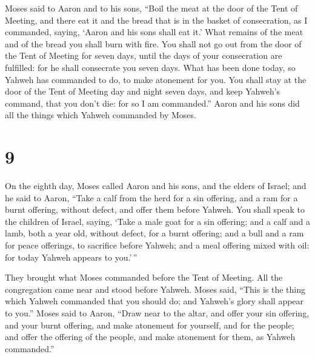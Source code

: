  Moses said to Aaron and to his sons, ``Boil the meat at
the door of the Tent of Meeting, and there eat it and the bread that is
in the basket of consecration, as I commanded, saying, `Aaron and his
sons shall eat it.'  What remains of the meat and of the
bread you shall burn with fire.  You shall not go out from
the door of the Tent of Meeting for seven days, until the days of your
consecration are fulfilled: for he shall consecrate you seven days.
 What has been done today, so Yahweh has commanded to do,
to make atonement for you.  You shall stay at the door of
the Tent of Meeting day and night seven days, and keep Yahweh's command,
that you don't die: for so I am commanded.''  Aaron and his
sons did all the things which Yahweh commanded by Moses.

\hypertarget{section-8}{%
\section{9}\label{section-8}}

 On the eighth day, Moses called Aaron and his sons, and the
elders of Israel;  and he said to Aaron, ``Take a calf from
the herd for a sin offering, and a ram for a burnt offering, without
defect, and offer them before Yahweh.  You shall speak to
the children of Israel, saying, `Take a male goat for a sin offering;
and a calf and a lamb, both a year old, without defect, for a burnt
offering;  and a bull and a ram for peace offerings, to
sacrifice before Yahweh; and a meal offering mixed with oil: for today
Yahweh appears to you.'\,''

 They brought what Moses commanded before the Tent of
Meeting. All the congregation came near and stood before Yahweh.
 Moses said, ``This is the thing which Yahweh commanded that
you should do; and Yahweh's glory shall appear to you.'' 
Moses said to Aaron, ``Draw near to the altar, and offer your sin
offering, and your burnt offering, and make atonement for yourself, and
for the people; and offer the offering of the people, and make atonement
for them, as Yahweh commanded.''

